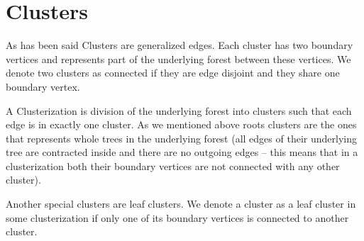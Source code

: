 \section{Clusters}

As has been said {\I Clusters} are generalized edges. Each cluster has two
{\I boundary vertices} and represents part of the underlying forest between
these vertices. We denote two clusters as {\I connected} if they are edge
disjoint and they share one boundary vertex.

A {\I Clusterization} is division of the underlying forest into clusters such
that each edge is in exactly one cluster. As we mentioned above {\I roots
clusters} are the ones that represents whole trees in the underlying forest
(all edges of their underlying tree are contracted inside and there are no
outgoing edges -- this means that in a clusterization both their boundary
vertices are not connected with any other cluster).

Another special clusters are {\I leaf clusters}. We denote a cluster as a
{\I leaf cluster} in some clusterization if only one of its boundary vertices is
connected to another cluster.

